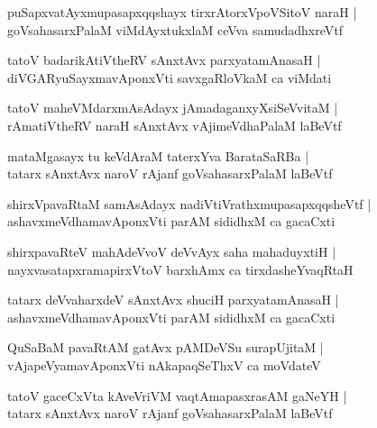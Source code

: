 \documentclass[twoside,12pt,openright]{book}
\newcounter{shloka}[chapter]
\begin{document}
\begin{shloka}
puSapxvatAyxmupasapxqqshayx tirxrAtorxVpoVSitoV naraH |\\
goVsahasarxPalaM viMdAyxtukxlaM ceVva samudadhxreVtf 
\end{shloka}

\begin{shloka}
tatoV badarikAtiVtheRV sAnxtAvx parxyatamAnasaH |\\
diVGARyuSayxmavAponxVti savxgaRloVkaM ca viMdati 
\end{shloka}

\begin{shloka}
tatoV maheVMdarxmAsAdayx jAmadaganxyXsiSeVvitaM |\\
rAmatiVtheRV naraH sAnxtAvx vAjimeVdhaPalaM laBeVtf 
\end{shloka}

\begin{shloka}
mataMgasayx tu keVdAraM taterxYva BarataSaRBa |\\
tatarx sAnxtAvx naroV rAjanf goVsahasarxPalaM laBeVtf 
\end{shloka}

\begin{shloka}
shirxVpavaRtaM samAsAdayx nadiVtiVrathxmupasapxqqsheVtf |\\
ashavxmeVdhamavAponxVti parAM sididhxM ca gacaCxti 
\end{shloka}

\begin{shloka}
shirxpavaRteV mahAdeVvoV deVvAyx saha mahaduyxtiH |\\
nayxvasatapxramapirxVtoV barxhAmx ca tirxdasheYvaqRtaH 
\end{shloka}

\begin{shloka}
tatarx deVvaharxdeV sAnxtAvx shuciH parxyatamAnasaH |\\
ashavxmeVdhamavAponxVti parAM sididhxM ca gacaCxti 
\end{shloka}

\begin{shloka}
QuSaBaM pavaRtAM gatAvx pAMDeVSu surapUjitaM |\\
vAjapeVyamavAponxVti nAkapaqSeThxV ca moVdateV 
\end{shloka}

\begin{shloka}
tatoV gaceCxVta kAveVriVM vaqtAmapasxrasAM  gaNeYH |\\
tatarx sAnxtAvx naroV rAjanf goVsahasarxPalaM laBeVtf 
\end{shloka}
\end{document}
